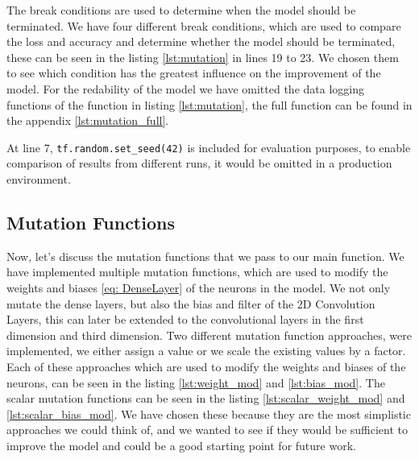 The break conditions are used to determine when the model should be terminated.
We have four different break conditions, which are used to compare the loss and accuracy and determine whether the model should be terminated, these can be seen in the listing \ref{lst:mutation} in lines 19 to 23.
We chosen them to see which condition has the greatest influence on the improvement of the model.
For the redability of the model we have omitted the data logging functions of the function in listing \ref{lst:mutation}, the full function can be found in the appendix \ref{lst:mutation_full}.

At line 7, \texttt{tf.random.set\_seed(42)} is included for evaluation purposes, to enable comparison of results from different runs, it would be omitted in a production environment.



\subsection{Mutation Functions}\label{subsec:mutation-functions}
Now, let's discuss the mutation functions that we pass to our main function.
We have implemented multiple mutation functions, which are used to modify the weights and biases \ref{eq: DenseLayer} of the neurons in the model.
We not only mutate the dense layers, but also the bias and filter of the 2D Convolution Layers, this can later be extended to the convolutional layers in the first dimension and third dimension.
Two different mutation function approaches, were implemented, we either assign a value or we scale the existing values by a factor.
Each of these approaches which are used to modify the weights and biases of the neurons, can be seen in the listing \ref{lst:weight_mod} and \ref{lst:bias_mod}.
The scalar mutation functions can be seen in the listing \ref{lst:scalar_weight_mod} and \ref{lst:scalar_bias_mod}.
We have chosen these because they are the most simplistic approaches we could think of, and we wanted to see if they would be sufficient to improve the model and could be a good starting point for future work.


